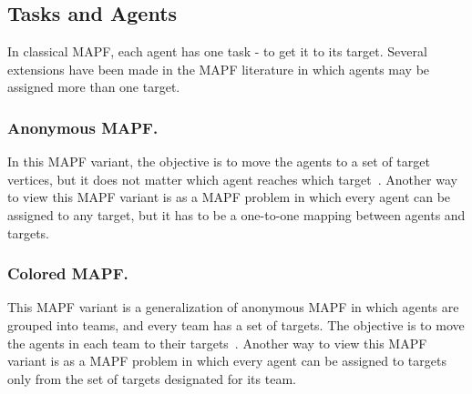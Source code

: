 \documentclass[letterpaper]{article} %
\newcommand{\mapf}{\ac{MAPF}\xspace}
\begin{document}





\subsection{Tasks and Agents}

In classical MAPF, each agent has one task - to get it to its target. Several extensions have been made in the MAPF literature in which agents may be assigned more than one target.  

\subsubsection{Anonymous \mapf.} 
In this \mapf variant, the objective is to move the agents to a set of target vertices, but it does not matter which agent reaches which target~\cite{kloder2006path,yu2013multi}. 
Another way to view this \mapf variant is as a \mapf problem in which every agent can be assigned to any target, but it has to be a one-to-one mapping between agents and targets. 

\subsubsection{Colored \mapf.}
This \mapf variant is a generalization of anonymous \mapf in which agents are grouped into teams, and every team has a set of targets. The objective is to move the agents in each team to their targets~\cite{ma2016optimal,solovey2014k}. Another way to view this \mapf variant is as a \mapf problem in which every agent can be assigned to targets only from the set of targets designated for its team. 
\end{document}
